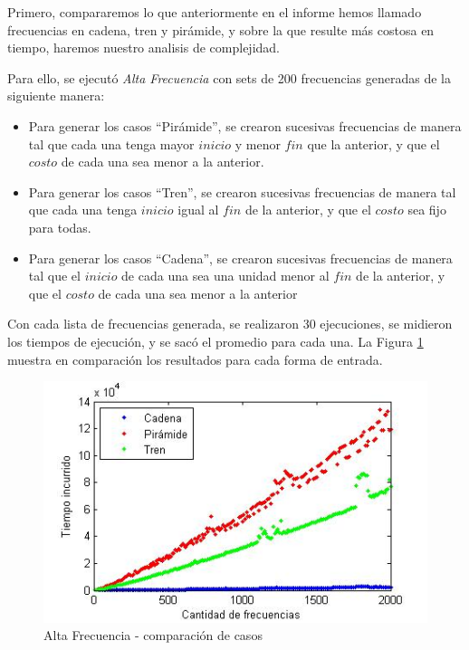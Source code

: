 \vspace*{0.3cm}

Primero, compararemos lo que anteriormente en el informe hemos llamado frecuencias en cadena, tren y pirámide, y sobre la que resulte más costosa en tiempo, haremos nuestro analisis de complejidad.

Para ello, se ejecutó {\it Alta Frecuencia} con sets de 200 frecuencias generadas de la siguiente manera: 
\begin{itemize}
\item	Para generar los casos ``Pirámide'', se crearon sucesivas frecuencias de manera tal que cada una tenga mayor $inicio$ y menor $fin$ que la anterior, y que el $costo$ de cada una sea menor a la anterior.
\item	Para generar los casos ``Tren'', se crearon sucesivas frecuencias de manera tal que cada una tenga $inicio$ igual al $fin$ de la anterior, y que el $costo$ sea fijo para todas.
\item 	Para generar los casos ``Cadena'', se crearon sucesivas frecuencias de manera tal que el $inicio$ de cada una sea una unidad menor al $fin$ de la anterior, y que el $costo$ de cada una sea menor a la anterior
\end{itemize}

Con cada lista de frecuencias generada, se realizaron 30 ejecuciones, se midieron los tiempos de ejecución, y se sacó el promedio para cada una.  La Figura \ref{fig:2-comp} muestra en comparación los resultados para cada forma de entrada.

\begin{figure}[htb]
	\begin{center}
    		\includegraphics[scale=0.5]{imagenes/2-comparacion.jpg}
	\end{center}
	\caption{Alta Frecuencia - comparación de casos}\label{fig:2-comp}
\end{figure}

